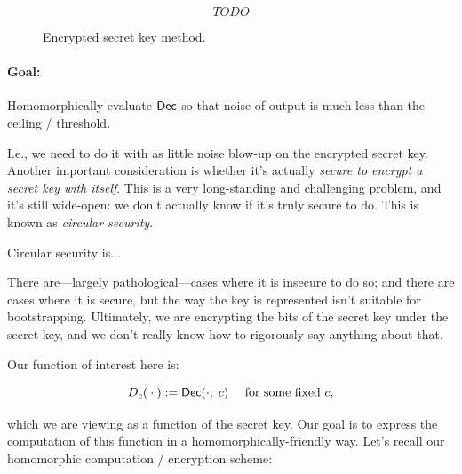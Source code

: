 \documentclass[11pt]{article}
\begin{document}
\begin{figure}[hbtp]
    \centering
    $$TODO$$
    \caption{Encrypted secret key method.}
    \label{fig:sk_encrypt}
\end{figure}

\paragraph{Goal:} Homomorphically evaluate $\mathsf{Dec}$ so that noise of output is much less than the ceiling / threshold.

\medskip

I.e., we need to do it with as little noise blow-up on the encrypted secret key. Another important consideration is whether it's actually \emph{secure to encrypt a secret key with itself}. This is a very long-standing and challenging problem, and it's still wide-open: we don't actually know if it's truly secure to do. This is known as \emph{circular security}.


\begin{definition}
    \label{def:circ-sec}
    Circular security is...
\end{definition}

There are---largely pathological---cases where it is insecure to do so; and there are cases where it is secure, but the way the key is represented isn't suitable for bootstrapping. Ultimately, we are encrypting the bits of the secret key under the secret key, and we don't really know how to rigorously say anything about that.

Our function of interest here is:

$$D_c(\:\cdot\:) := \mathsf{Dec}(\cdot,\;c) \textmd{ \quad for some fixed $c$,}$$

\noindent which we are viewing as a function of the secret key. Our goal is to express the computation of this function in a homomorphically-friendly way. Let's recall our homomorphic computation / encryption scheme:
\end{document}
